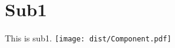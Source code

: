 \documentclass[index]{subfiles}
\begin{document}
\chapter{Sub1}
This is sub1.
\texttt{[image: dist/Component.pdf]}
\end{document}
